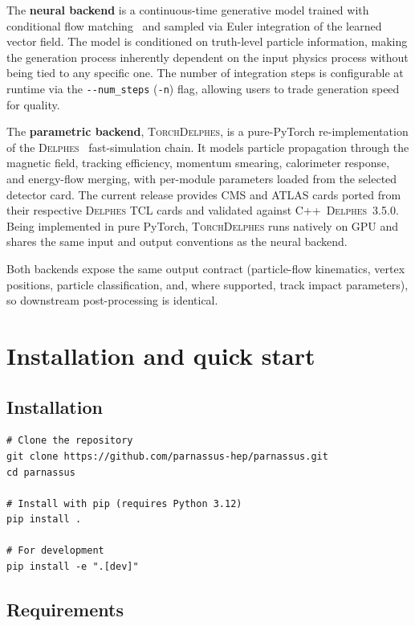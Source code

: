 \documentclass[11pt,a4paper]{article}          %
\begin{document}
The \textbf{neural backend} is a continuous-time generative model trained with
conditional flow matching~\cite{lipman2023flow,liu2023flow} and sampled via
Euler integration of the learned vector field. The model is conditioned on
truth-level particle information, making the generation process inherently
dependent on the input physics process without being tied to any specific one.
The number of integration steps is configurable at runtime via the
\texttt{-{}-num\_steps} (\texttt{-n}) flag, allowing users to trade generation
speed for quality.

The \textbf{parametric backend}, \textsc{TorchDelphes}, is a pure-PyTorch
re-implementation of the \textsc{Delphes}~\cite{delphes} fast-simulation chain.
It models particle propagation through the magnetic field, tracking
efficiency, momentum smearing, calorimeter response, and energy-flow merging,
with per-module parameters loaded from the selected detector card. The
current release provides CMS and ATLAS cards ported from their respective
\textsc{Delphes} TCL cards and validated against C++~\textsc{Delphes}~3.5.0.
Being implemented in pure PyTorch, \textsc{TorchDelphes} runs natively on GPU
and shares the same input and output conventions as the neural backend.

Both backends expose the same output contract (particle-flow kinematics,
vertex positions, particle classification, and, where supported, track impact
parameters), so downstream post-processing is identical.

\section{Installation and quick start}
\label{sec:quickstart}

\subsection{Installation}

\begin{lstlisting}[style=bash,caption={Installation commands.}]
# Clone the repository
git clone https://github.com/parnassus-hep/parnassus.git
cd parnassus

# Install with pip (requires Python 3.12)
pip install .

# For development
pip install -e ".[dev]"
\end{lstlisting}

\subsection{Requirements}
\end{document}
